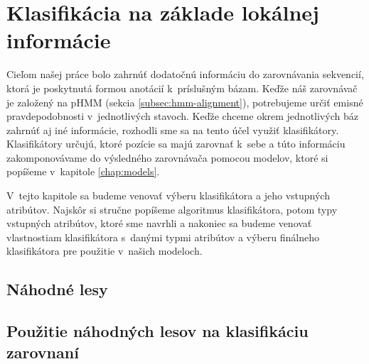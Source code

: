 \chapter[Klasifikácia]{Klasifikácia na základe lokálnej informácie}
\label{chap:clf}

Cieľom našej práce bolo zahrnúť dodatočnú informáciu do zarovnávania sekvencií, ktorá je poskytnutá formou anotácií k~príslušným bázam. Keďže náš zarovnávač je založený na pHMM (sekcia \ref{subsec:hmm-alignment}), potrebujeme určiť emisné pravdepodobnosti v~jednotlivých stavoch. Keďže chceme okrem jednotlivých báz zahrnúť aj iné informácie, rozhodli sme sa na tento účel využiť klasifikátory. Klasifikátory určujú, ktoré pozície sa majú zarovnať k~sebe a túto informáciu zakomponovávame do výsledného zarovnávača pomocou modelov, ktoré si popíšeme v~kapitole \ref{chap:models}.

V~tejto kapitole sa budeme venovať výberu klasifikátora a jeho vstupných atribútov. Najskôr si stručne popíšeme algoritmus klasifikátora, potom typy vstupných atribútov, ktoré sme navrhli a nakoniec sa budeme venovať vlastnostiam klasifikátora s~danými typmi atribútov a výberu finálneho klasifikátora pre použitie v~našich modeloch.

\section{Náhodné lesy}


\section[Použitie náh. lesov v~zarovnaní]{Použitie náhodných lesov na klasifikáciu zarovnaní}
\label{sec:use-rf-alignment}

